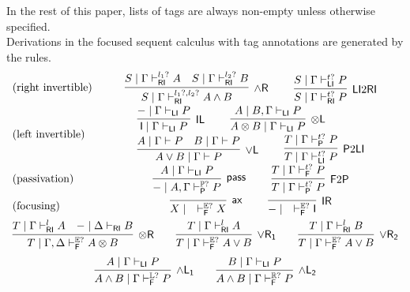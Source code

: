 \documentclass[submission,copyright,creativecommons]{eptcs}
\theoremstyle{definition}
\newcommand{\tl}{\otimes \mathsf{L}}
\newcommand{\tr}{\otimes \mathsf{R}}
\newcommand{\pass}{\mathsf{pass}}
\newcommand{\unitl}{\mathsf{IL}}
\newcommand{\unitr}{\mathsf{IR}}
\newcommand{\andlone}{\land \mathsf{L_{1}}}
\newcommand{\andltwo}{\land \mathsf{L_{2}}}
\newcommand{\andr}{\land \mathsf{R}}
\newcommand{\orl}{\lor \mathsf{L}}
\newcommand{\orrone}{\lor \mathsf{R_{1}}}
\newcommand{\orrtwo}{\lor \mathsf{R_{2}}}
\newcommand{\ax}{\mathsf{ax}}
\newcommand{\ot}{\otimes}
\newcommand{\I}{\mathsf{I}}
\newcommand{\RI}{\mathsf{RI}}
\newcommand{\LI}{\mathsf{LI}}
\newcommand{\Pass}{\mathsf{P}}
\newcommand{\F}{\mathsf{F}}
\newcommand{\tP}{\mathbb{P}}
\newcommand{\tL}{\mathbb{L}}
\newcommand{\tR}{\mathbb{R}}
\newcommand{\tE}{\mathbb{E}}
\newcommand{\proofbox}[1]{\begin{tabular}{l} #1 \end{tabular}}
\begin{document}
In the rest of this paper, lists of tags are always non-empty unless otherwise specified.
\\
Derivations in the focused sequent calculus with tag annotations are generated by the rules.
\begin{equation}\label{eq:focus}
  \begin{array}{lc}
    \text{(right invertible)} & %
    \proofbox{
      \infer[\andr]{S \mid \Gamma \vdash^{l_1?, l_2?}_{\RI} A \land B}{
        S \mid \Gamma \vdash^{l_1?}_{\RI} A
        &
        S \mid \Gamma \vdash^{l_2?}_{\RI} B
      }
    \qquad
    \infer[\LI 2 \RI]{S \mid \Gamma \vdash^{t?}_{\RI} P}{S \mid \Gamma \vdash^{t?}_{\LI} P}
    }
    \\[10pt]
    \text{(left invertible)} & %
    \proofbox{
      \infer[\unitl]{\I \mid \Gamma \vdash_{\LI} P}{{-} \mid \Gamma \vdash_{\LI} P}
    \qquad
    \infer[\tl]{A \ot B \mid \Gamma \vdash_{\LI} P}{A \mid B , \Gamma \vdash_{\LI} P}
    \\
    \infer[\orl]{A \lor B \mid \Gamma \vdash P}{
      A \mid \Gamma \vdash P
      &
      B \mid \Gamma \vdash P
    }
    \qquad
    \infer[\Pass 2 \LI]{T \mid \Gamma \vdash^{t?}_{\LI} P}{T \mid \Gamma \vdash^{t?}_{\Pass} P}
    }
    \\[10pt]
    \text{(passivation)} &
    \proofbox{
    \infer[\pass]{{-} \mid A , \Gamma \vdash^{\tP?}_{\Pass} P }{
      A \mid \Gamma \vdash_{\LI} P
    }
    \qquad
    \infer[\F 2 \Pass]{T \mid \Gamma \vdash^{t?}_{\Pass} P}{
      T \mid \Gamma \vdash^{t?}_{\F} P
    }
    }
    \\[10pt]
    \text{(focusing)} &    %
    \proofbox{\infer[\ax]{X \mid \quad \vdash^{\tE?}_{\F} X}{}
    \qquad
    \infer[\unitr]{{-} \mid \quad \vdash^{\tE?}_{\F} \I}{}
    }
    \\[6pt]
    \multicolumn{2}{c}{
    \infer[\tr]{T \mid \Gamma , \Delta \vdash^{\tE?}_{\F} A \ot B}{
      T \mid \Gamma \vdash^{l}_{\RI} A
      &
      {-} \mid \Delta \vdash_{\RI} B
    }
    \qquad
    \infer[\orrone]{T \mid \Gamma \vdash^{\tE?}_{\F} A \lor B}{T \mid \Gamma \vdash^{l}_{\RI} A}
    \qquad
    \infer[\orrtwo]{T \mid \Gamma \vdash^{\tE?}_{\F} A \lor B}{T \mid \Gamma \vdash^{l}_{\RI} B}
    }
    \\[6pt]
    \multicolumn{2}{c}{
    \infer[\andlone]{A \land B \mid \Gamma \vdash^{\tL?}_{\F} P}{A \mid \Gamma \vdash_{\LI} P}
    \qquad
    \infer[\andltwo]{A \land B \mid \Gamma \vdash^{\tR?}_{\F} P}{B \mid \Gamma \vdash_{\LI} P}
    }
  \end{array}
\end{equation}
\end{document}
